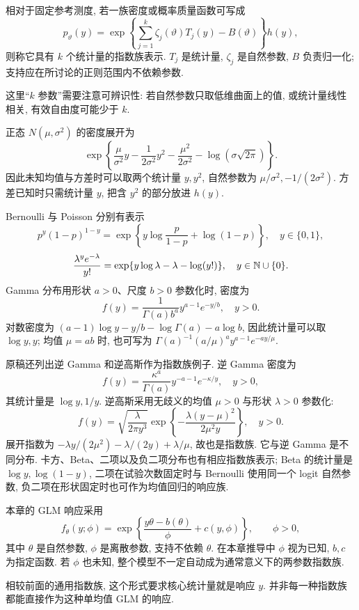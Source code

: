 \begin{definition}[指数族]
相对于固定参考测度, 若一族密度或概率质量函数可写成
\[
 p_\vartheta(y)=\exp\left\{\sum_{j=1}^k\zeta_j(\vartheta)T_j(y)-B(\vartheta)\right\}h(y),
\]
则称它具有 $k$ 个统计量的指数族表示. $T_j$ 是统计量, $\zeta_j$ 是自然参数, $B$ 负责归一化; 支持应在所讨论的正则范围内不依赖参数. 
\end{definition}
这里“$k$ 参数”需要注意可辨识性: 若自然参数只取低维曲面上的值, 或统计量线性相关, 有效自由度可能少于 $k$. 

正态 $N(\mu,\sigma^2)$ 的密度展开为
\[
 \exp\left\{\frac\mu{\sigma^2}y-\frac1{2\sigma^2}y^2
 -\frac{\mu^2}{2\sigma^2}-\log(\sigma\sqrt{2\pi})\right\}.
\]
因此未知均值与方差时可以取两个统计量 $y,y^2$, 自然参数为 $\mu/\sigma^2,-1/(2\sigma^2)$. 方差已知时只需统计量 $y$, 把含 $y^2$ 的部分放进 $h(y)$. 

Bernoulli 与 Poisson 分别有表示
\[
 p^y(1-p)^{1-y}
 =\exp\left\{y\log\frac p{1-p}+\log(1-p)\right\},\quad y\in\{0,1\},
\]
\[
 \frac{\lambda^ye^{-\lambda}}{y!}
 =\exp\{y\log\lambda-\lambda-\log(y!)\},\quad y\in\mathbb N\cup\{0\}.
\]
Gamma 分布用形状 $a>0$、尺度 $b>0$ 参数化时, 密度为
\[
 f(y)=\frac1{\Gamma(a)b^a}y^{a-1}e^{-y/b},\quad y>0.
\]
对数密度为 $(a-1)\log y-y/b-\log\Gamma(a)-a\log b$, 因此统计量可以取 $\log y,y$; 均值 $\mu=ab$ 时, 也可写为 $\Gamma(a)^{-1}(a/\mu)^a y^{a-1}e^{-ay/\mu}$. 

原稿还列出逆 Gamma 和逆高斯作为指数族例子. 逆 Gamma 密度为
\[
 f(y)=\frac{\kappa^a}{\Gamma(a)}y^{-a-1}e^{-\kappa/y},\quad y>0,
\]
其统计量是 $\log y,1/y$. 逆高斯采用无歧义的均值 $\mu>0$ 与形状 $\lambda>0$ 参数化: 
\[
 f(y)=\sqrt{\frac\lambda{2\pi y^3}}
 \exp\left\{-\frac{\lambda(y-\mu)^2}{2\mu^2y}\right\},\quad y>0.
\]
展开指数为 $-\lambda y/(2\mu^2)-\lambda/(2y)+\lambda/\mu$, 故也是指数族. 它与逆 Gamma 是不同分布. 卡方、Beta、二项以及负二项分布也有相应指数族表示; Beta 的统计量是 $\log y,\log(1-y)$, 二项在试验次数固定时与 Bernoulli 使用同一个 logit 自然参数, 负二项在形状固定时也可作为均值回归的响应族. 

\begin{definition}
本章的 GLM 响应采用
\[
 f_\theta(y;\phi)=\exp\left\{\frac{y\theta-b(\theta)}\phi+c(y,\phi)\right\},\qquad\phi>0,
\]
其中 $\theta$ 是自然参数, $\phi$ 是离散参数, 支持不依赖 $\theta$. 在本章推导中 $\phi$ 视为已知, $b,c$ 为指定函数. 若 $\phi$ 也未知, 整个模型不一定自动成为通常意义下的两参数指数族. 
\end{definition}
相较前面的通用指数族, 这个形式要求核心统计量就是响应 $y$. 并非每一种指数族都能直接作为这种单均值 GLM 的响应. 

